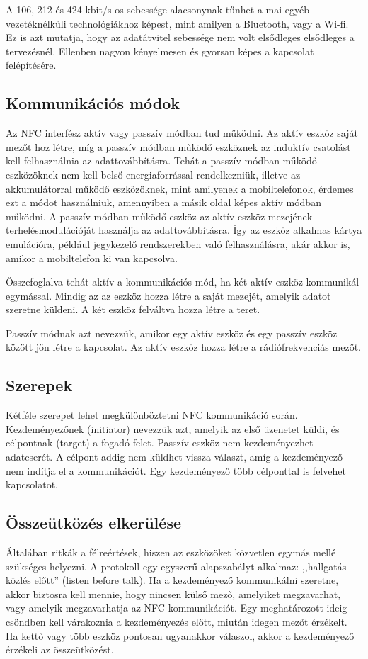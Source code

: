 \documentclass[12pt]{article}
\begin{document}
A 106, 212 és 424 kbit/s-os sebessége alacsonynak tűnhet a mai egyéb
vezetéknélküli technológiákhoz képest, mint amilyen a Bluetooth, vagy a Wi-fi.
Ez is azt mutatja, hogy az adatátvitel sebessége nem volt elsődleges elsődleges
a tervezésnél. Ellenben nagyon kényelmesen és gyorsan képes a kapcsolat
felépítésére.

\subsection{Kommunikációs módok}
Az NFC interfész aktív vagy passzív módban tud működni. Az aktív eszköz saját
mezőt hoz létre, míg a passzív módban működő eszköznek az induktív csatolást
kell felhasználnia az adattovábbításra. Tehát a passzív módban működő eszközöknek
nem kell belső energiaforrással rendelkezniük, illetve az akkumulátorral működő
eszközöknek, mint amilyenek a mobiltelefonok, érdemes ezt a módot használniuk, 
amennyiben a másik oldal képes aktív módban működni. A passzív módban működő
eszköz az aktív eszköz mezejének terhelésmodulációját használja az
adattovábbításra. Így az eszköz alkalmas kártya emulációra, például 
jegykezelő rendszerekben való felhasználásra, akár  akkor is, amikor a mobiltelefon
ki van kapcsolva.

Összefoglalva tehát aktív a kommunikációs mód, ha két aktív eszköz kommunikál 
egymással. Mindig az az eszköz hozza létre a saját mezejét, amelyik adatot
szeretne küldeni. A két eszköz felváltva hozza létre a teret.

Passzív módnak azt nevezzük, amikor egy aktív eszköz és egy passzív eszköz között
jön létre a kapcsolat. Az aktív eszköz hozza létre a rádiófrekvenciás mezőt.

\subsection{Szerepek}
Kétféle szerepet lehet megkülönböztetni NFC kommunikáció során. Kezdeményezőnek 
(initiator) nevezzük azt, amelyik az első üzenetet küldi, és célpontnak (target)
a fogadó felet. Passzív eszköz nem kezdeményezhet adatcserét. A célpont addig 
nem küldhet vissza választ, amíg a kezdeményező nem indítja el a kommunikációt.
Egy kezdeményező több célponttal is felvehet kapcsolatot.

\subsection{Összeütközés elkerülése}
Általában ritkák a félreértések, hiszen az eszközöket közvetlen egymás mellé 
szükséges helyezni. A protokoll egy egyszerű alapszabályt alkalmaz: ,,hallgatás
közlés előtt'' (listen before talk). Ha a kezdeményező kommunikálni szeretne,
akkor biztosra kell mennie, hogy nincsen külső mező, amelyiket megzavarhat,
vagy amelyik megzavarhatja az NFC kommunikációt. Egy meghatározott 
ideig csöndben kell várakoznia a kezdeményezés előtt, miután idegen mezőt 
érzékelt. Ha kettő vagy több eszköz pontosan ugyanakkor válaszol, akkor a
kezdeményező érzékeli az összeütközést.
\end{document}
